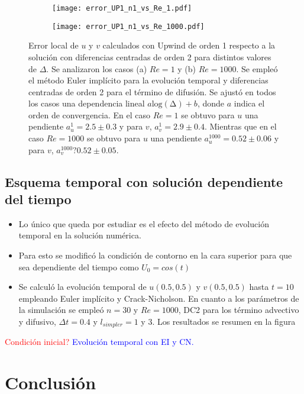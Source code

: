 \documentclass[aps,prb,twocolumn,superscriptaddress,floatfix,longbibliography,10pt]{revtex4-2}
\newcounter{para}
\begin{document}
\begin{figure}
  \centering
  \begin{subfigure}[b]{0.3\textwidth}
      \centering
      \texttt{[image: error\_UP1\_n1\_vs\_Re\_1.pdf]}
      \caption{}
      \label{fig:error_UP1_n1_vs_Re_1}
  \end{subfigure}
  \hfill
  \begin{subfigure}[b]{0.3\textwidth}
      \centering
      \texttt{[image: error\_UP1\_n1\_vs\_Re\_1000.pdf]}
      \caption{}
      \label{fig:error_UP1_n1_vs_Re_1000}
  \end{subfigure}
     \caption{Error local de $u$ y $v$ calculados con Upwind de orden 1 respecto a la solución con diferencias centradas de orden 2 para distintos valores de $\Delta$. Se analizaron los casos (a) $Re = 1$ y (b) $Re = 1000$. Se empleó el método Euler implícito para la evolución temporal y diferencias centradas de orden 2 para el término de difusión. Se ajustó en todos los casos una dependencia lineal $a \mathrm{log(\Delta)} + b$, donde $a$ indica el orden de convergencia. En el caso $Re = 1$ se obtuvo para $u$ una pendiente $a_{u}^1 = 2.5 \pm 0.3$ y para $v$, $a_{v}^1 = 2.9 \pm 0.4$. Mientras que en el caso $Re = 1000$ se obtuvo para $u$ una pendiente $a_u^1000 = 0.52 \pm 0.06$ y para $v$, $a_v^1000 ? 0.52 \pm 0.05$.
     }
     \label{fig:error_UP1_n1_vs_Re}
\end{figure}





\subsection{Esquema temporal con solución dependiente del tiempo}
\begin{itemize}
  \item Lo único que queda por estudiar es el efecto del método de evolución temporal en la solución numérica.
  \item Para esto se modificó la condición de contorno en la cara superior para que sea dependiente del tiempo como $U_0 = cos(t)$
  \item Se calculó la evolución temporal de $u(0.5,0.5)$ y $v(0.5,0.5)$ hasta $t = 10$ empleando Euler implícito y Crack-Nicholson. En cuanto a los parámetros de la simulación se empleó $n = 30$ y $Re = 1000$, DC2 para los término advectivo y difusivo, $\Delta t = 0.4$ y $l_{simpler} = 1$ y $3$. Los resultados se resumen en la figura

\end{itemize}


\textcolor{red}{Condición inicial?}
\textcolor{blue}{Evolución temporal con EI y CN.}








\section{Conclusión}


\end{document}
